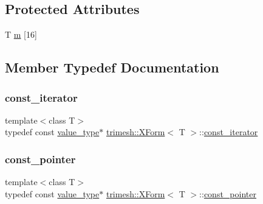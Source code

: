 \subsection*{Protected Attributes}
\begin{DoxyCompactItemize}
\item 
T \hyperlink{classtrimesh_1_1XForm_ab481d3d615eba7c43c417bc0706c5701}{m} \mbox{[}16\mbox{]}
\end{DoxyCompactItemize}


\subsection{Member Typedef Documentation}
\mbox{\label{classtrimesh_1_1XForm_af342cefd0ecc382861c2d89f24423d71}} 
\subsubsection{\texorpdfstring{const\+\_\+iterator}{const\_iterator}}
{\footnotesize\ttfamily template$<$class T$>$ \\
typedef const \hyperlink{classtrimesh_1_1XForm_af259af02eaea86d3451dc23a47ad896c}{value\+\_\+type}$\ast$ \hyperlink{classtrimesh_1_1XForm}{trimesh\+::\+X\+Form}$<$ T $>$\+::\hyperlink{classtrimesh_1_1XForm_af342cefd0ecc382861c2d89f24423d71}{const\+\_\+iterator}}

\mbox{\label{classtrimesh_1_1XForm_a0cfc3dd93b0190520e3152ef27a32117}} 
\subsubsection{\texorpdfstring{const\+\_\+pointer}{const\_pointer}}
{\footnotesize\ttfamily template$<$class T$>$ \\
typedef const \hyperlink{classtrimesh_1_1XForm_af259af02eaea86d3451dc23a47ad896c}{value\+\_\+type}$\ast$ \hyperlink{classtrimesh_1_1XForm}{trimesh\+::\+X\+Form}$<$ T $>$\+::\hyperlink{classtrimesh_1_1XForm_a0cfc3dd93b0190520e3152ef27a32117}{const\+\_\+pointer}}


